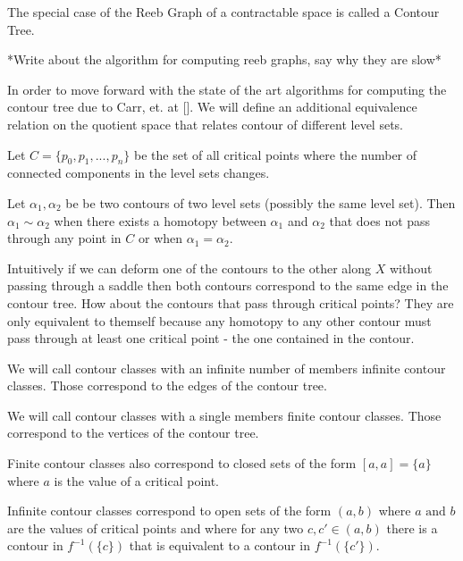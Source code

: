 The special case of the Reeb Graph of a contractable space is called a Contour Tree. 

*Write about the algorithm for computing reeb graphs, say why they are slow*

In order to move forward with the state of the art algorithms for computing the contour tree due to Carr, et. at []. We will define an additional equivalence relation on the quotient space that relates contour of different level sets.


\begin{defn}  Let $C = \{p_0, p_1, ..., p_n\}$ be the set of all critical points where the number of connected components in the level sets changes. \end{defn}

\begin{defn}   
    Let $\alpha_1, \alpha_2$ be be two contours of two level sets (possibly the same level set). Then $\alpha_1 \sim \alpha_2$ when there exists a homotopy between $\alpha_1$ and $\alpha_2$ that does not pass through any point in $C$ or when $\alpha_1 = \alpha_2$.
\end{defn}


Intuitively if we can deform one of the contours to the other along $X$ without passing through a saddle then both contours correspond to the same edge in the contour tree. How about the contours that pass through critical points? They are only equivalent to themself because any homotopy to any other contour must pass through at least one critical point - the one contained in the contour.


\begin{defn} We will call contour classes with an infinite number of members infinite contour classes. Those correspond to the edges of the contour tree.  \end{defn}

\begin{defn} We will call contour classes with a single members finite contour classes. Those correspond to the vertices of the contour tree.  \end{defn}

Finite contour classes also correspond to closed sets of the form $[a, a] = \{a\}$ where $a$ is the value of a critical point.

Infinite contour classes correspond to open sets of the form $(a, b)$ where $a \text{ and } b$ are the values of critical points and where for any two $c, c' \in (a, b)$ there is a contour in $f^{-1}(\{c\})$ that is equivalent to a contour in $f^{-1}(\{c'\})$.

